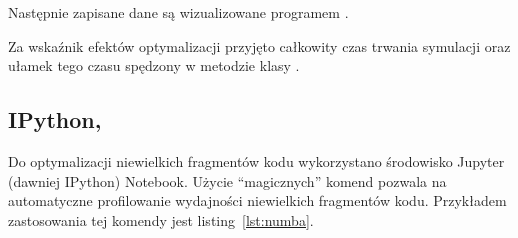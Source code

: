 Następnie zapisane dane są wizualizowane programem .

Za wskaźnik efektów optymalizacji przyjęto całkowity czas trwania symulacji
oraz ułamek tego czasu spędzony w metodzie  klasy .
\subsection{IPython, }
Do optymalizacji niewielkich fragmentów kodu wykorzystano środowisko Jupyter (dawniej IPython) Notebook\cite{jupyter}.
Użycie ``magicznych'' komend  pozwala na automatyczne profilowanie wydajności niewielkich fragmentów kodu.
Przykładem zastosowania tej komendy jest listing~\ref{lst:numba}.
